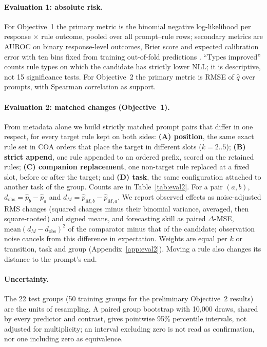 \documentclass{article}
\newcommand{\phat}{\hat{p}}
\newcommand{\qhat}{\hat{q}}
\begin{document}
\paragraph{Evaluation 1: absolute risk.} For Objective~1 the primary metric is the binomial negative log-likelihood per
response $\times$ rule outcome, pooled over all prompt--rule rows; secondary metrics are AUROC on binary
response-level outcomes, Brier score and expected calibration error with ten bins fixed from training out-of-fold
predictions \citep{guo2017calibration}. ``Types improved'' counts rule types on which the candidate has strictly lower
NLL; it is descriptive, not 15 significance tests. For Objective~2 the primary metric is RMSE of $\qhat$ over prompts, with
Spearman correlation as support.

\paragraph{Evaluation 2: matched changes (Objective~1).} From metadata alone we build strictly matched prompt pairs
that differ in one respect, for every target rule kept on both sides: \textbf{(A) position}, the same exact rule set in
COA orders that place the target in different slots ($k=2..5$); \textbf{(B) strict append}, one rule appended
to an ordered prefix, scored on the retained rules; \textbf{(C) companion replacement}, one non-target rule replaced
at a fixed slot, before or after the target; and \textbf{(D) task}, the same configuration attached to another task of
the group. Counts are in Table~\ref{tab:eval2}. For a pair
$(a,b)$, $d_{\text{obs}}=\phat_b-\phat_a$ and $d_M=\hat p_{M,b}-\hat p_{M,a}$. We report observed effects as
noise-adjusted RMS changes (squared changes minus their binomial variance, averaged, then square-rooted) and signed
means, and forecasting skill as paired $\Delta$-MSE, $\text{mean}(d_M-d_{\text{obs}})^2$ of the comparator minus that of
the candidate; observation noise cancels from this difference in expectation. Weights are equal per $k$ or transition,
task and group (Appendix~\ref{app:eval2}). Moving a rule also changes its distance to the prompt's end.

\paragraph{Uncertainty.} The 22 test groups (50 training groups for the preliminary Objective~2 results) are the units of resampling. A paired group bootstrap \citep{efron1979bootstrap} with 10,000 draws, shared by every predictor and contrast, gives
pointwise 95\% percentile intervals, not adjusted for multiplicity; an interval excluding zero is not read as
confirmation, nor one including zero as equivalence.
\end{document}
